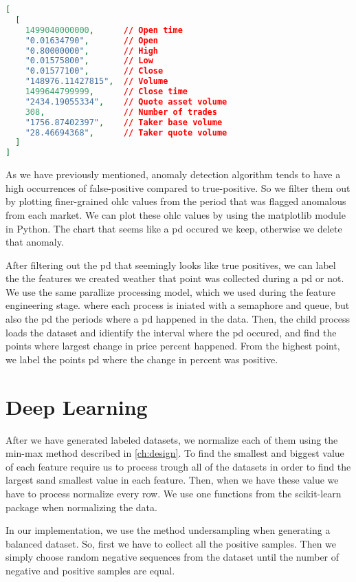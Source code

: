 \begin{lstlisting}[language=json, caption={Historical kline response from Binance (Source \cite{binance_git})}, label=code:binance_kline, firstnumber=1]
[
  [
    1499040000000,      // Open time
    "0.01634790",       // Open
    "0.80000000",       // High
    "0.01575800",       // Low
    "0.01577100",       // Close
    "148976.11427815",  // Volume
    1499644799999,      // Close time
    "2434.19055334",    // Quote asset volume
    308,                // Number of trades
    "1756.87402397",    // Taker base volume
    "28.46694368",      // Taker quote volume
  ]
]
\end{lstlisting}

As we have previously mentioned, anomaly detection algorithm tends to have a high occurrences of false-positive compared to true-positive. So we filter them out by plotting finer-grained \ac{ohlc} values from the period that was flagged anomalous from each market. We can plot these \ac{ohlc} values by using the matplotlib module in Python. The chart that seems like a \ac{pd} occured we keep, otherwise we delete that anomaly.

After filtering out the \ac{pd} that seemingly looks like true positives, we can label the the features we created weather that point was collected during a \ac{pd} or not. We use the same parallize processing model, which we used during the feature engineering stage. where each process is iniated with a semaphore and queue, but also the \ac{pd} the periods where a \ac{pd} happened in the data. Then, the child process loads the dataset and idientify the interval where the \ac{pd} occured, and find the points where largest change in price percent happened. From the highest point, we label the points \ac{pd} where the change in percent was positive.

\section{Deep Learning}
After we have generated labeled datasets, we normalize each of them using the min-max method described in \autoref{ch:design}. To find the smallest and biggest value of each feature require us to process trough all of the datasets in order to find the largest sand smallest value in each feature. Then, when we have these value we have to process normalize every row. We use one functions from the scikit-learn package when normalizing the data.

In our implementation, we use the method undersampling when generating a balanced dataset. So, first we have to collect all the positive samples. Then we simply choose random negative sequences from the dataset until the number of negative and positive samples are equal.

